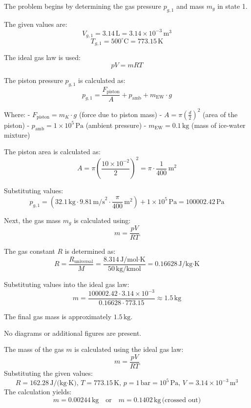 The problem begins by determining the gas pressure \( p_{g,1} \) and mass \( m_g \) in state 1.  

The given values are:  
\[
V_{g,1} = 3.14 \, \text{L} = 3.14 \times 10^{-3} \, \text{m}^3
\]
\[
T_{g,1} = 500^\circ\text{C} = 773.15 \, \text{K}
\]

The ideal gas law is used:  
\[
p V = m R T
\]

The piston pressure \( p_{g,1} \) is calculated as:  
\[
p_{g,1} = \frac{F_{\text{piston}}}{A} + p_{\text{amb}} + m_{\text{EW}} \cdot g
\]

Where:  
- \( F_{\text{piston}} = m_K \cdot g \) (force due to piston mass)  
- \( A = \pi \left(\frac{d}{2}\right)^2 \) (area of the piston)  
- \( p_{\text{amb}} = 1 \times 10^5 \, \text{Pa} \) (ambient pressure)  
- \( m_{\text{EW}} = 0.1 \, \text{kg} \) (mass of ice-water mixture)  

The piston area is calculated as:  
\[
A = \pi \left(\frac{10 \times 10^{-2}}{2}\right)^2 = \pi \cdot \frac{1}{400} \, \text{m}^2
\]

Substituting values:  
\[
p_{g,1} = \left(32.1 \, \text{kg} \cdot 9.81 \, \text{m/s}^2 \cdot \frac{\pi}{400} \, \text{m}^2\right) + 1 \times 10^5 \, \text{Pa} = 100002.42 \, \text{Pa}
\]

Next, the gas mass \( m_g \) is calculated using:  
\[
m = \frac{p V}{R T}
\]

The gas constant \( R \) is determined as:  
\[
R = \frac{R_{\text{universal}}}{M} = \frac{8.314 \, \text{J/mol·K}}{50 \, \text{kg/kmol}} = 0.16628 \, \text{J/kg·K}
\]

Substituting values into the ideal gas law:  
\[
m = \frac{100002.42 \cdot 3.14 \times 10^{-3}}{0.16628 \cdot 773.15} \approx 1.5 \, \text{kg}
\]  

The final gas mass is approximately \( 1.5 \, \text{kg} \).  

No diagrams or additional figures are present.

The mass of the gas \( m \) is calculated using the ideal gas law:  
\[
m = \frac{p V}{R T}
\]  
Substituting the given values:  
\[
R = 162.28 \, \text{J/(kg·K)}, \, T = 773.15 \, \text{K}, \, p = 1 \, \text{bar} = 10^5 \, \text{Pa}, \, V = 3.14 \times 10^{-3} \, \text{m}^3
\]  
The calculation yields:  
\[
m = 0.00244 \, \text{kg} \quad \text{or} \quad m = 0.1402 \, \text{kg} \, \text{(crossed out)}
\]